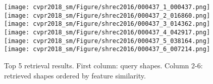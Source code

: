 \documentclass[10pt,twocolumn,letterpaper]{article}
\begin{document}
\begin{figure*}[h]
        \texttt{[image: cvpr2018\_sm/Figure/shrec2016/000437\_1\_000437.png]}
        \texttt{[image: cvpr2018\_sm/Figure/shrec2016/000437\_2\_016860.png]}
        \texttt{[image: cvpr2018\_sm/Figure/shrec2016/000437\_3\_014362.png]}
        \texttt{[image: cvpr2018\_sm/Figure/shrec2016/000437\_4\_042917.png]}
        \texttt{[image: cvpr2018\_sm/Figure/shrec2016/000437\_5\_038164.png]}
        \texttt{[image: cvpr2018\_sm/Figure/shrec2016/000437\_6\_007214.png]}
        
        \caption{Top 5 retrieval results. First column: query shapes. Column 2-6: retrieved shapes ordered by feature similarity.}
        \label{fig_shrec16_visualization}
        \vspace{-4pt}
\end{figure*}
\end{document}
